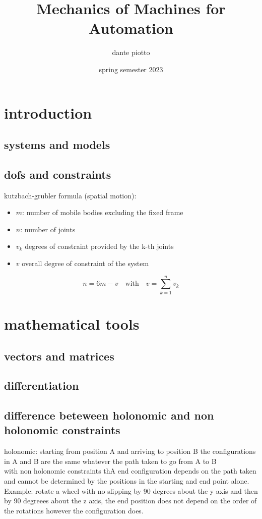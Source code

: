 \documentclass{book}
\title{Mechanics of Machines for Automation}
\author{dante piotto}
\date{spring semester 2023}
\begin{document}
\maketitle

\chapter{introduction}

\section{systems and models}


\section{dofs and constraints}

kutzbach-grubler formula (spatial motion):
\begin{itemize}
    \item $m$: number of mobile bodies excluding the fixed frame
    \item $n$: number of joints
    \item $v_k$ degrees of constraint provided by the k-th joints
    \item $v$ overall degree of constraint of the system
\end{itemize}
\[
    n=6m-v \quad \text{with}\quad v=\sum_{k=1}^{n}v_k
\]
\chapter{mathematical tools}

\section{vectors and matrices}

\section{differentiation}


\section{difference beteween holonomic and non holonomic constraints}
holonomic: starting from position A and arriving to position B the configurations in A and B are the same whatever the path taken to go from A to B\\
with non holonomic constraints thA end configuration depends on the path taken and cannot be determined by the positions in the starting and end point alone.\\
Example: rotate a wheel with no slipping by 90 degrees about the y axis and then by 90 degreees about the z axis, the end position does not depend on the order of the rotations however the configuration does. 
\end{document}
